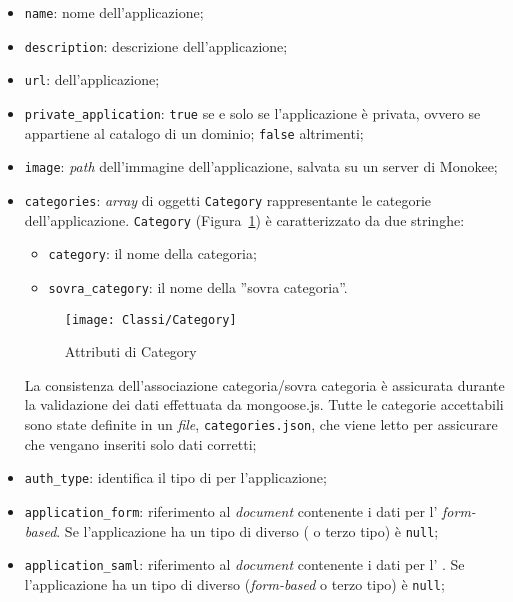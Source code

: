 \begin{itemize}
\item \texttt{name}: nome dell'applicazione;
\item \texttt{description}: descrizione dell'applicazione;
\item \texttt{url}:  dell'applicazione;
\item \texttt{private\_application}: \texttt{true} se e solo se l'applicazione è privata, ovvero se appartiene al catalogo di un dominio; \texttt{false} altrimenti;
\item \texttt{image}: \textit{path} dell'immagine dell'applicazione, salvata su un server di Monokee;
\item \texttt{categories}: \textit{array} di oggetti \texttt{Category} rappresentante le categorie dell'applicazione. \texttt{Category} (Figura~\ref{fig:Category}) è caratterizzato da due stringhe:
	\begin{itemize}
	\item \texttt{category}: il nome della categoria;
	\item \texttt{sovra\_category}: il nome della ''sovra categoria''.
	\end{itemize}
	\begin{figure}[h]
	  \begin{center}
	    \texttt{[image: Classi/Category]}
	  \caption[Attributi di Category]{Attributi di Category}
	  \label{fig:Category}
	  \end{center} 
	\end{figure}
La consistenza dell'associazione categoria/sovra categoria è assicurata durante la validazione dei dati effettuata da mongoose.js. Tutte le categorie accettabili sono state definite in un \textit{file}, \texttt{categories.json}, che viene letto per assicurare che vengano inseriti solo dati corretti;
\item \texttt{auth\_type}: identifica il tipo di  per l'applicazione;
\item \texttt{application\_form}: riferimento al \textit{document} contenente i dati per l' \textit{form-based}. Se l'applicazione ha un tipo di  diverso ( o terzo tipo) è \texttt{null};
\item \texttt{application\_saml}: riferimento al \textit{document} contenente i dati per l' . Se l'applicazione ha un tipo di  diverso (\textit{form-based} o terzo tipo) è \texttt{null};

\end{itemize}
